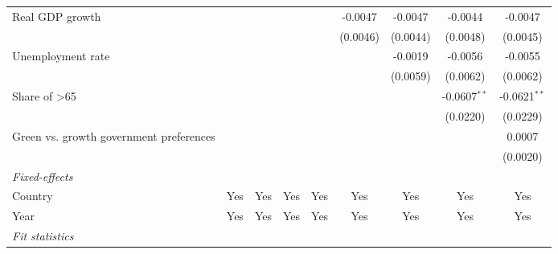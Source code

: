 \begin{table}[htbp]
\begin{tabular}{lcccccccc}
      Real GDP growth                                                        &          &          &                 &                 & -0.0047         & -0.0047         & -0.0044         & -0.0047\\   
                                                                             &          &          &                 &                 & (0.0046)        & (0.0044)        & (0.0048)        & (0.0045)\\   
      Unemployment rate                                                      &          &          &                 &                 &                 & -0.0019         & -0.0056         & -0.0055\\   
                                                                             &          &          &                 &                 &                 & (0.0059)        & (0.0062)        & (0.0062)\\   
      Share of >65                                                           &          &          &                 &                 &                 &                 & -0.0607$^{**}$  & -0.0621$^{**}$\\   
                                                                             &          &          &                 &                 &                 &                 & (0.0220)        & (0.0229)\\   
      Green vs. growth government preferences                                &          &          &                 &                 &                 &                 &                 & 0.0007\\   
                                                                             &          &          &                 &                 &                 &                 &                 & (0.0020)\\   
      \midrule
      \emph{Fixed-effects}\\
      Country                                                                & Yes      & Yes      & Yes             & Yes             & Yes             & Yes             & Yes             & Yes\\  
      Year                                                                   & Yes      & Yes      & Yes             & Yes             & Yes             & Yes             & Yes             & Yes\\  
      \midrule
      \emph{Fit statistics}\\

\end{tabular}
\end{table}

